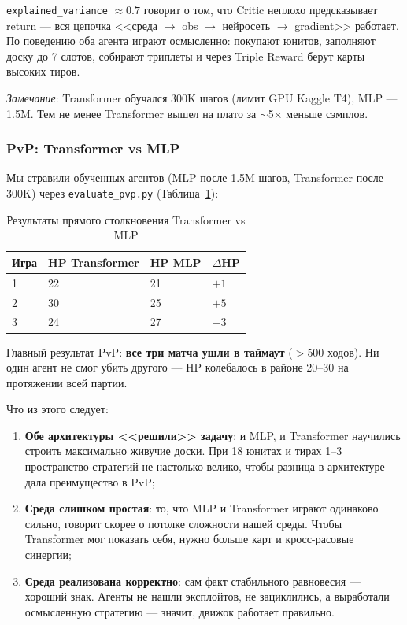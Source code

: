 \documentclass[a4paper,12pt]{extarticle}
\begin{document}
\texttt{explained\_variance} $\approx 0.7$ говорит о том, что Critic неплохо предсказывает return --- вся цепочка <<среда $\to$ obs $\to$ нейросеть $\to$ gradient>> работает. По поведению оба агента играют осмысленно: покупают юнитов, заполняют доску до 7 слотов, собирают триплеты и через Triple Reward берут карты высоких тиров.

\emph{Замечание}: Transformer обучался 300K шагов (лимит GPU Kaggle T4), MLP --- 1.5M. Тем не менее Transformer вышел на плато за $\sim$5$\times$ меньше сэмплов.

\subsubsection{PvP: Transformer vs MLP}

Мы стравили обученных агентов (MLP после 1.5M шагов, Transformer после 300K) через \texttt{evaluate\_pvp.py} (Таблица~\ref{tab:pvp_results}):

\begin{longtable}{p{3cm}p{3cm}p{3cm}p{3cm}}
\caption{Результаты прямого столкновения Transformer vs MLP}\label{tab:pvp_results}\\
\toprule
\textbf{Игра} & \textbf{HP Transformer} & \textbf{HP MLP} & \textbf{$\Delta$HP} \\
\midrule
1 & 22 & 21 & $+1$ \\
2 & 30 & 25 & $+5$ \\
3 & 24 & 27 & $-3$ \\
\bottomrule
\end{longtable}

Главный результат PvP: \textbf{все три матча ушли в таймаут} ($>$500 ходов). Ни один агент не смог убить другого --- HP колебалось в районе 20--30 на протяжении всей партии.

Что из этого следует:

\begin{enumerate}[noitemsep]
  \item \textbf{Обе архитектуры <<решили>> задачу}: и MLP, и Transformer научились строить максимально живучие доски. При 18 юнитах и тирах 1--3 пространство стратегий не настолько велико, чтобы разница в архитектуре дала преимущество в PvP;
  \item \textbf{Среда слишком простая}: то, что MLP и Transformer играют одинаково сильно, говорит скорее о потолке сложности нашей среды. Чтобы Transformer мог показать себя, нужно больше карт и кросс-расовые синергии;
  \item \textbf{Среда реализована корректно}: сам факт стабильного равновесия --- хороший знак. Агенты не нашли эксплойтов, не зациклились, а выработали осмысленную стратегию --- значит, движок работает правильно.
\end{enumerate}
\end{document}
